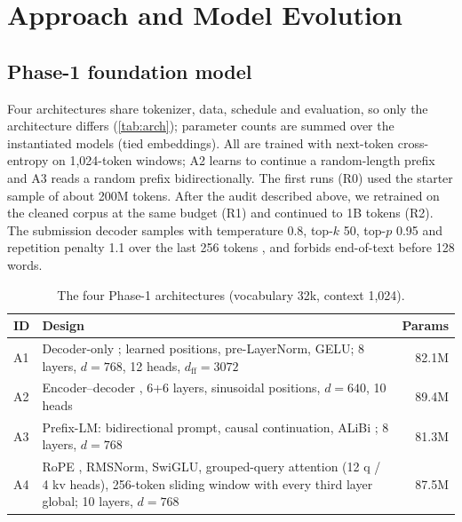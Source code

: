 \documentclass[11pt, oneside]{article}
\begin{document}
\section{Approach and Model Evolution}
\subsection{Phase-1 foundation model}
Four architectures share tokenizer, data, schedule and evaluation, so only the architecture differs
(\autoref{tab:arch}); parameter counts are summed over the instantiated models (tied embeddings).  All are trained with next-token
cross-entropy on 1,024-token windows; A2 learns to continue a random-length prefix and A3 reads a random
prefix bidirectionally.  The first runs (R0) used the starter sample of about 200M tokens.  After the audit
described above, we retrained on the cleaned corpus at the same budget (R1) and continued to 1B tokens (R2).
The submission decoder samples with temperature 0.8, top-$k$ 50, top-$p$ 0.95 and repetition penalty 1.1 over
the last 256 tokens \cite{keskar2019ctrl}, and forbids end-of-text before 128 words.

\begin{table}[!t]\centering\footnotesize
\caption{The four Phase-1 architectures (vocabulary 32k, context 1,024).}\label{tab:arch}
\begin{tabularx}{\linewidth}{lXr}\toprule
ID & Design & Params\\\midrule
A1 & Decoder-only \cite{radford2019gpt2}; learned positions, pre-LayerNorm, GELU; 8 layers, $d=768$, 12 heads, $d_\text{ff}=3072$ & 82.1M\\
A2 & Encoder--decoder \cite{vaswani2017attention}, 6+6 layers, sinusoidal positions, $d=640$, 10 heads & 89.4M\\
A3 & Prefix-LM: bidirectional prompt, causal continuation, ALiBi \cite{press2022alibi}; 8 layers, $d=768$ & 81.3M\\
A4 & RoPE \cite{su2021roformer}, RMSNorm, SwiGLU, grouped-query attention \cite{ainslie2023gqa} (12 q / 4 kv heads),
256-token sliding window \cite{beltagy2020longformer} with every third layer global; 10 layers, $d=768$ & 87.5M\\
\bottomrule\end{tabularx}\end{table}
\end{document}
